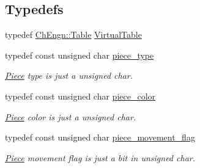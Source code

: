 \subsection*{Typedefs}
\begin{DoxyCompactItemize}
\item 
typedef \hyperlink{classChEngn_1_1Table}{ChEngn::Table} \hyperlink{namespaceChEngn_a5ba229504d25ed1b2086f1df62f6db41}{VirtualTable}
\item 
\hypertarget{namespaceChEngn_a2a35c185f259757a78e937575b8ed483}{
typedef const unsigned char \hyperlink{namespaceChEngn_a2a35c185f259757a78e937575b8ed483}{piece\_\-type}}
\label{namespaceChEngn_a2a35c185f259757a78e937575b8ed483}

\begin{DoxyCompactList}\small\item\em \hyperlink{classChEngn_1_1Piece}{Piece} type is just a unsigned char. \item\end{DoxyCompactList}\item 
\hypertarget{namespaceChEngn_a9c81426c0134a97288a226c122daf62f}{
typedef const unsigned char \hyperlink{namespaceChEngn_a9c81426c0134a97288a226c122daf62f}{piece\_\-color}}
\label{namespaceChEngn_a9c81426c0134a97288a226c122daf62f}

\begin{DoxyCompactList}\small\item\em \hyperlink{classChEngn_1_1Piece}{Piece} color is just a unsigned char. \item\end{DoxyCompactList}\item 
\hypertarget{namespaceChEngn_a491b2eba2f766087f4f28948005ab16a}{
typedef const unsigned char \hyperlink{namespaceChEngn_a491b2eba2f766087f4f28948005ab16a}{piece\_\-movement\_\-flag}}
\label{namespaceChEngn_a491b2eba2f766087f4f28948005ab16a}

\begin{DoxyCompactList}\small\item\em \hyperlink{classChEngn_1_1Piece}{Piece} movement flag is just a bit in unsigned char. \item\end{DoxyCompactList}\end{DoxyCompactItemize}

